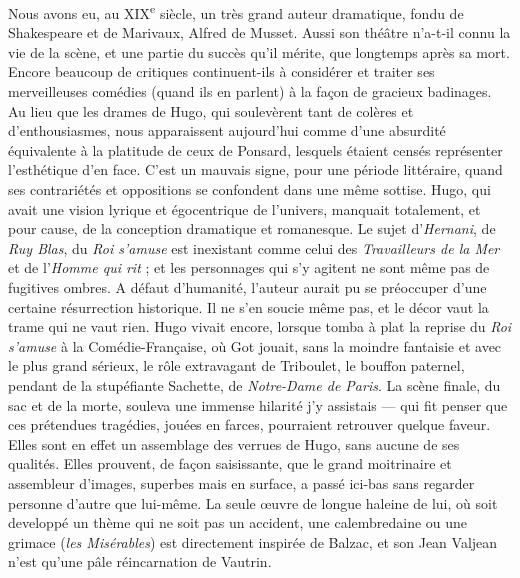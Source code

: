 \documentclass[french,twoside]{book} %
\begin{document}
Nous avons eu, au XIX\textsuperscript{e} siècle, un très grand auteur dramatique, fondu de Shakespeare et de Marivaux, Alfred de Musset. Aussi son théâtre n’a-t-il connu la vie de la scène, et une partie du succès qu’il mérite, que longtemps après sa mort. Encore beaucoup de critiques continuent-ils à considérer et traiter ses merveilleuses comédies (quand ils en parlent) à la façon de gracieux badinages. Au lieu que les drames de Hugo, qui soulevèrent tant de colères et d’enthousiasmes, nous apparaissent aujourd’hui comme d’une absurdité équivalente à la platitude de ceux de Ponsard, lesquels étaient censés représenter l’esthétique d’en face. C’est un mauvais signe, pour une période littéraire, quand ses contrariétés et oppositions se confondent dans une même sottise. Hugo, qui avait une vision lyrique et égocentrique de l’univers, manquait totalement, et pour cause, de la conception dramatique et romanesque. Le sujet d’{\itshape Hernani}, de {\itshape Ruy Blas}, du {\itshape Roi s’amuse} est inexistant comme celui des {\itshape Travailleurs de la Mer} et de l’{\itshape Homme qui rit} ; et les personnages qui s’y agitent ne sont même pas de fugitives ombres. A défaut d’humanité, l’auteur aurait pu se préoccuper d’une certaine résurrection historique. Il ne s’en soucie même pas, et le décor vaut la trame qui ne vaut rien. Hugo vivait encore, lorsque tomba à plat la reprise du {\itshape Roi s’amuse} à la Comédie-Française, où Got jouait, sans la moindre fantaisie et avec le plus grand sérieux, le rôle extravagant de Triboulet, le bouffon paternel, pendant de la stupéfiante Sachette, de {\itshape Notre-Dame de Paris}. La scène finale, du sac et de la morte, souleva une immense hilarité j’y assistais — qui fit penser que ces prétendues tragédies, jouées en farces, pourraient retrouver quelque faveur. Elles sont en effet un assemblage des verrues de Hugo, sans aucune de ses qualités. Elles prouvent, de façon saisissante, que le grand moitrinaire et assembleur d’images, superbes mais en surface, a passé ici-bas sans regarder personne d’autre que lui-même. La seule œuvre de longue haleine de lui, où soit developpé un thème qui ne soit pas un accident, une calembredaine ou une grimace ({\itshape les Misérables}) est directement inspirée de Balzac, et son Jean Valjean n’est qu’une pâle réincarnation de Vautrin.\par
\end{document}
